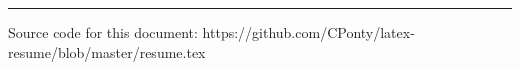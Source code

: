 \documentclass[letterpaper,11pt]{article}
\newcommand{\resheading}[1]{{\large \fcolorbox{black}{mygrey}{\begin{minipage}{\textwidth}{\textbf{#1 \vphantom{p\^{E}}}}\end{minipage}}}}
\begin{document}


\rule{550pt}{0.5pt}
Source code for this document: https://github.com/CPonty/latex-resume/blob/master/resume.tex
\end{document}
